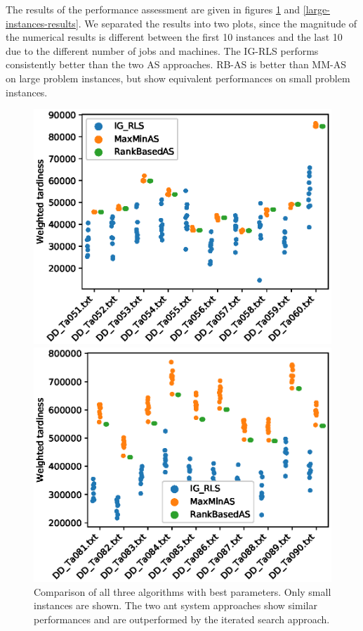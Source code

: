 \documentclass[runningheads]{llncs}
\begin{document}
The results of the performance assessment are given in figures
\ref{small-instances-results} and \ref{large-instances-results}. We separated
the results into two plots, since the magnitude of the numerical results is
different between the first 10 instances and the last 10 due to the different
number of jobs and machines. The IG-RLS performs consistently better than the
two AS approaches. RB-AS is better than MM-AS on large problem instances, but
show equivalent performances on small problem instances.

\begin{figure}
    \centering
    \begin{minipage}{.48\textwidth}
		\centering
		\includegraphics[width=1.1\textwidth]{small-instances-results.eps}
		\caption{Comparison of all three algorithms with best parameters. Only
		small instances are shown. The two ant system approaches show similar
		performances and are outperformed by the iterated search approach.}
		\label{small-instances-results}
    \end{minipage}
    \hspace{0.02\textwidth}
    \begin{minipage}{.48\textwidth}
		\centering
		\includegraphics[width=1.1\textwidth]{large-instances-results.eps}

\end{minipage}
\end{figure}
\end{document}
